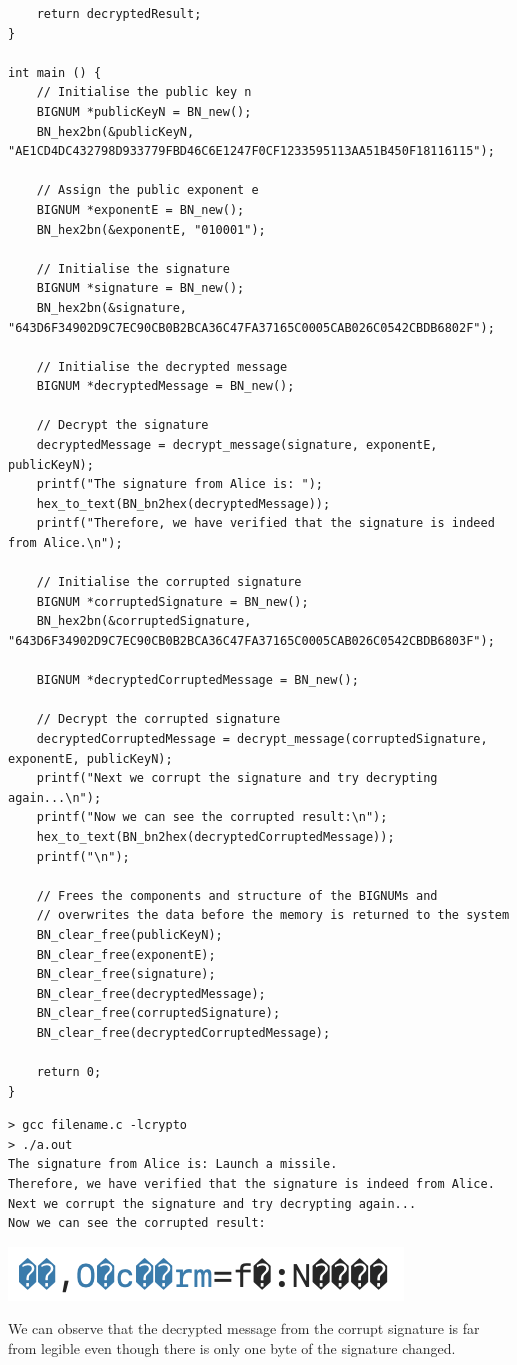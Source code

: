 \documentclass[12pt]{article}
\begin{document}
\begin{lstlisting}
    return decryptedResult;
}

int main () {
    // Initialise the public key n
    BIGNUM *publicKeyN = BN_new();
    BN_hex2bn(&publicKeyN, "AE1CD4DC432798D933779FBD46C6E1247F0CF1233595113AA51B450F18116115");

    // Assign the public exponent e
    BIGNUM *exponentE = BN_new();
    BN_hex2bn(&exponentE, "010001");

    // Initialise the signature
    BIGNUM *signature = BN_new();
    BN_hex2bn(&signature, "643D6F34902D9C7EC90CB0B2BCA36C47FA37165C0005CAB026C0542CBDB6802F");

    // Initialise the decrypted message
    BIGNUM *decryptedMessage = BN_new();
    
    // Decrypt the signature
    decryptedMessage = decrypt_message(signature, exponentE, publicKeyN);
    printf("The signature from Alice is: ");
    hex_to_text(BN_bn2hex(decryptedMessage));
    printf("Therefore, we have verified that the signature is indeed from Alice.\n");

    // Initialise the corrupted signature
    BIGNUM *corruptedSignature = BN_new();
    BN_hex2bn(&corruptedSignature, "643D6F34902D9C7EC90CB0B2BCA36C47FA37165C0005CAB026C0542CBDB6803F");

    BIGNUM *decryptedCorruptedMessage = BN_new();

    // Decrypt the corrupted signature
    decryptedCorruptedMessage = decrypt_message(corruptedSignature, exponentE, publicKeyN);
    printf("Next we corrupt the signature and try decrypting again...\n");
    printf("Now we can see the corrupted result:\n");
    hex_to_text(BN_bn2hex(decryptedCorruptedMessage));
    printf("\n");

    // Frees the components and structure of the BIGNUMs and
    // overwrites the data before the memory is returned to the system            
    BN_clear_free(publicKeyN);
    BN_clear_free(exponentE);
    BN_clear_free(signature);
    BN_clear_free(decryptedMessage);
    BN_clear_free(corruptedSignature);
    BN_clear_free(decryptedCorruptedMessage);

    return 0;    
}
\end{lstlisting}

\begin{framed}
    \begin{verbatim}
> gcc filename.c -lcrypto
> ./a.out
The signature from Alice is: Launch a missile.
Therefore, we have verified that the signature is indeed from Alice.
Next we corrupt the signature and try decrypting again...
Now we can see the corrupted result:
    \end{verbatim}
    \includegraphics{rsa-corrupted.png}
\end{framed}
\noindent
We can observe that the decrypted message from the corrupt signature is
far from legible even though there is only one byte of the signature changed.
\end{document}
